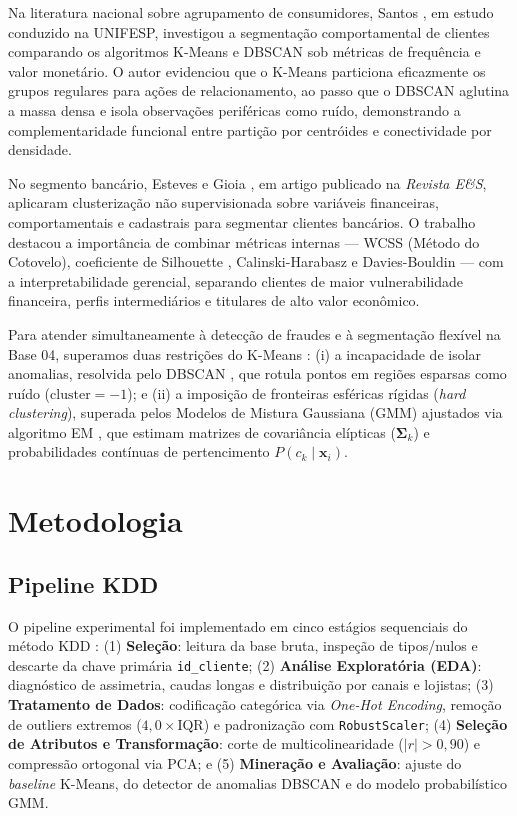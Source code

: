\documentclass[10pt,twocolumn]{article}
\begin{document}
Na literatura nacional sobre agrupamento de consumidores, Santos \cite{santos2023}, em estudo conduzido na UNIFESP, investigou a segmentação comportamental de clientes comparando os algoritmos K-Means e DBSCAN sob métricas de frequência e valor monetário. O autor evidenciou que o K-Means particiona eficazmente os grupos regulares para ações de relacionamento, ao passo que o DBSCAN aglutina a massa densa e isola observações periféricas como ruído, demonstrando a complementaridade funcional entre partição por centróides e conectividade por densidade.

No segmento bancário, Esteves e Gioia \cite{esteves2025}, em artigo publicado na \textit{Revista E\&S}, aplicaram clusterização não supervisionada sobre variáveis financeiras, comportamentais e cadastrais para segmentar clientes bancários. O trabalho destacou a importância de combinar métricas internas --- WCSS (Método do Cotovelo), coeficiente de Silhouette \cite{rousseeuw1987}, Calinski-Harabasz e Davies-Bouldin --- com a interpretabilidade gerencial, separando clientes de maior vulnerabilidade financeira, perfis intermediários e titulares de alto valor econômico.

Para atender simultaneamente à detecção de fraudes e à segmentação flexível na Base 04, superamos duas restrições do K-Means \cite{macqueen1967}: (i) a incapacidade de isolar anomalias, resolvida pelo DBSCAN \cite{ester1996}, que rotula pontos em regiões esparsas como ruído ($\text{cluster} = -1$); e (ii) a imposição de fronteiras esféricas rígidas (\textit{hard clustering}), superada pelos Modelos de Mistura Gaussiana (GMM) ajustados via algoritmo EM \cite{dempster1977,reynolds2009}, que estimam matrizes de covariância elípticas ($\boldsymbol{\Sigma}_k$) e probabilidades contínuas de pertencimento $P(c_k \mid \mathbf{x}_i)$.

\section{Metodologia}

\subsection{Pipeline KDD}

O pipeline experimental foi implementado em cinco estágios sequenciais do método KDD \cite{fayyad1996}: (1) \textbf{Seleção}: leitura da base bruta, inspeção de tipos/nulos e descarte da chave primária \texttt{id\_cliente}; (2) \textbf{Análise Exploratória (EDA)}: diagnóstico de assimetria, caudas longas e distribuição por canais e lojistas; (3) \textbf{Tratamento de Dados}: codificação categórica via \textit{One-Hot Encoding}, remoção de outliers extremos ($4,0 \times \text{IQR}$) e padronização com \texttt{RobustScaler}; (4) \textbf{Seleção de Atributos e Transformação}: corte de multicolinearidade ($|r| > 0,90$) e compressão ortogonal via PCA; e (5) \textbf{Mineração e Avaliação}: ajuste do \textit{baseline} K-Means, do detector de anomalias DBSCAN e do modelo probabilístico GMM.
\end{document}
